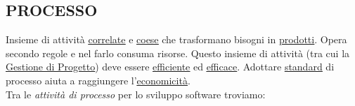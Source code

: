 		\subsection{PROCESSO}  \label{processo}
		Insieme di attività \underline{\hyperref[correlato]{correlate}} e \underline{\hyperref[coeso]{coese}} che trasformano bisogni in \underline{\hyperref[prodotto]{prodotti}}. Opera secondo regole e nel farlo consuma risorse. Questo insieme di attività (tra cui la \underline{\hyperref[gestioneprogetto]{Gestione di Progetto}}) deve essere \underline{\hyperref[efficienza]{efficiente}} ed \underline{\hyperref[efficacia]{efficace}}. Adottare \underline{\hyperref[standard]{standard}} di processo aiuta a raggiungere l'\underline{\hyperref[economicita]{economicità}}.\\
		Tra le \textit{attività di processo} per lo sviluppo software troviamo: 
